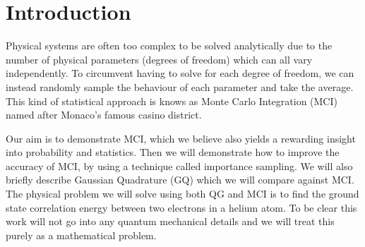 \section{Introduction}

Physical systems are often too complex to be solved analytically due to the
number of physical parameters (degrees of freedom) which can all vary
independently. To circumvent having to solve for each degree of
freedom, we can instead randomly sample the behaviour of each parameter
and take the average. This kind of statistical approach is knows as Monte Carlo
Integration (MCI) named after Monaco's famous casino district.

Our aim is to demonstrate MCI, which we believe also yields
a rewarding insight into probability and statistics.  Then we
will demonstrate how to improve the accuracy of MCI, by
using a technique called importance sampling. We will also briefly describe
Gaussian Quadrature (GQ) which we will compare against MCI. The
physical problem we will solve using both QG and MCI is to find the ground state
correlation energy between two electrons in a helium atom. To be clear this work
will not go into any quantum mechanical details and we will treat this purely
as a mathematical problem.
